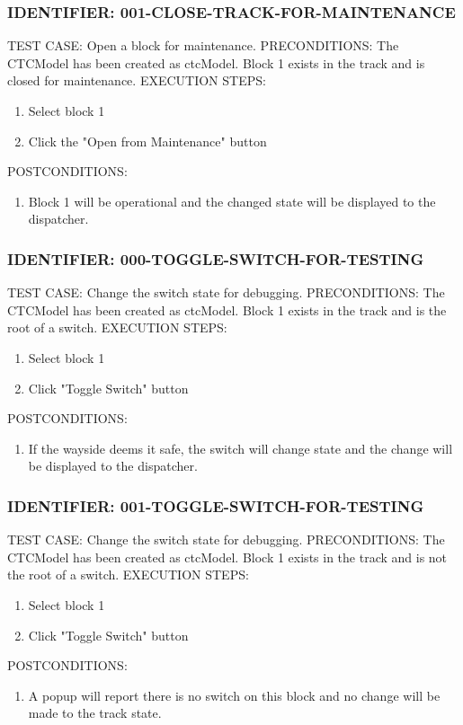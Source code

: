\documentclass{scrreprt}
\begin{document}
\subsubsection{IDENTIFIER: 001-CLOSE-TRACK-FOR-MAINTENANCE}
TEST CASE: Open a block for maintenance.
PRECONDITIONS: The CTCModel has been created as ctcModel. Block 1 exists in the track and is closed for maintenance.
EXECUTION STEPS:
\begin{enumerate}
	\item Select block 1
	\item Click the "Open from Maintenance" button
\end{enumerate}
POSTCONDITIONS:
\begin{enumerate}
	\item Block 1 will be operational and the changed state will be displayed to the dispatcher.
\end{enumerate}

\subsubsection{IDENTIFIER: 000-TOGGLE-SWITCH-FOR-TESTING}
TEST CASE: Change the switch state for debugging.
PRECONDITIONS: The CTCModel has been created as ctcModel. Block 1 exists in the track and is the root of a switch.
EXECUTION STEPS:
\begin{enumerate}
	\item Select block 1
	\item Click "Toggle Switch" button
\end{enumerate}
POSTCONDITIONS:
\begin{enumerate}
	\item If the wayside deems it safe, the switch will change state and the change will be displayed to the dispatcher.
\end{enumerate}

\subsubsection{IDENTIFIER: 001-TOGGLE-SWITCH-FOR-TESTING}
TEST CASE: Change the switch state for debugging.
PRECONDITIONS: The CTCModel has been created as ctcModel. Block 1 exists in the track and is not the root of a switch.
EXECUTION STEPS:
\begin{enumerate}
	\item Select block 1
	\item Click "Toggle Switch" button
\end{enumerate}
POSTCONDITIONS:
\begin{enumerate}
	\item A popup will report there is no switch on this block and no change will be made to the track state.
\end{enumerate}
\end{document}
